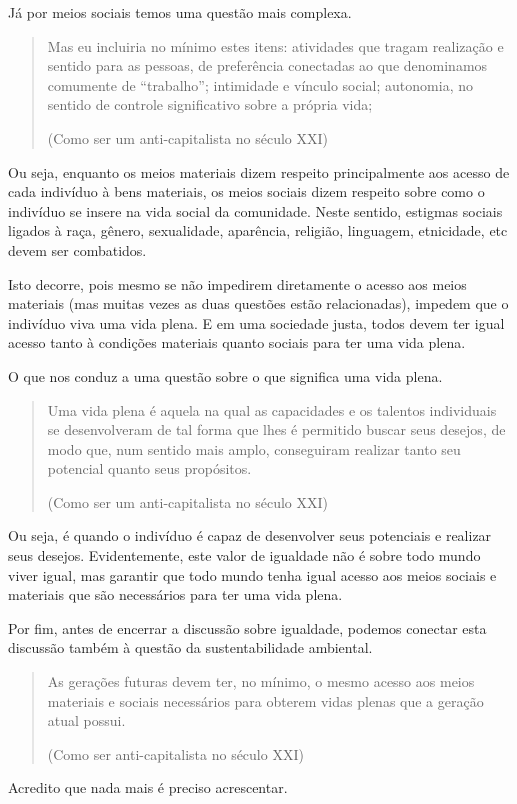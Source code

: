 Já por meios sociais temos uma questão mais complexa.

\begin{quote}
Mas eu incluiria no mínimo estes itens: atividades que tragam realização e sentido para as pessoas, de preferência conectadas ao que denominamos comumente de “trabalho”; intimidade e vínculo social; autonomia, no sentido de controle significativo sobre a própria vida; 

(Como ser um anti-capitalista no século XXI)
\end{quote}

Ou seja, enquanto os meios materiais dizem respeito principalmente aos acesso de cada indivíduo à bens materiais, os meios sociais dizem respeito sobre como o indivíduo se insere na vida social da comunidade. Neste sentido, estigmas sociais ligados à raça, gênero, sexualidade, aparência, religião, linguagem, etnicidade, etc devem ser combatidos. 

Isto decorre, pois mesmo se não impedirem diretamente o acesso aos meios materiais (mas muitas vezes as duas questões estão relacionadas), impedem que o indivíduo viva uma vida plena. E em uma sociedade justa, todos devem ter igual acesso tanto à condições materiais quanto sociais  para ter uma vida plena.

O que nos conduz a uma questão sobre o que significa uma vida plena. 

\begin{quote}
Uma vida plena é aquela na qual as capacidades e os talentos individuais se desenvolveram de tal forma que lhes é permitido buscar seus desejos, de modo que, num sentido mais amplo, conseguiram realizar tanto seu potencial quanto seus propósitos. 

(Como ser um anti-capitalista no século XXI)
\end{quote}

Ou seja, é quando o indivíduo é capaz de desenvolver seus potenciais e realizar seus desejos. Evidentemente, este valor de igualdade não é sobre todo mundo viver igual, mas garantir que todo mundo tenha igual acesso aos meios sociais e materiais que são necessários para ter uma vida plena.

Por fim, antes de encerrar a discussão sobre igualdade, podemos conectar esta discussão também à questão da sustentabilidade ambiental.

\begin{quote}
As gerações futuras devem ter, no mínimo, o mesmo acesso aos meios materiais e sociais necessários para obterem vidas plenas que a geração atual possui.

(Como ser anti-capitalista no século XXI)
\end{quote}
Acredito que nada mais é preciso acrescentar.

